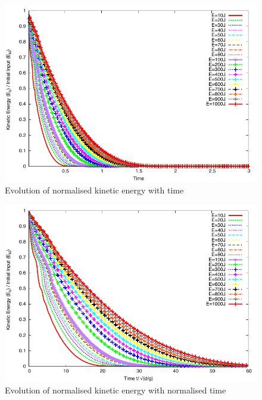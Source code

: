 \begin{figure}[tbhp]
\centering
\includegraphics[width=\textwidth]{Normalised_Energy_Slope}
\caption{Evolution of normalised kinetic energy with time}
\label{fig:Normalised_Energy_Slope}
\end{figure}

\begin{figure}[tbhp]
\centering
\includegraphics[width=\textwidth]{Normalised_Energy_Time_Slope}
\caption{Evolution of normalised kinetic energy with normalised time}
\label{fig:Normalised_Energy_Time_Slope}
\end{figure}

